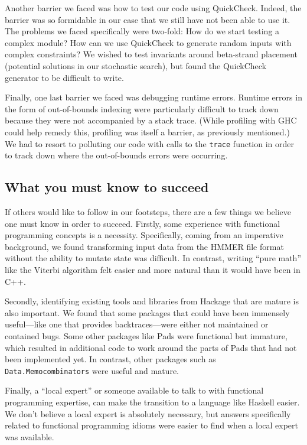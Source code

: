 \documentclass[preprint,nonatbib,blockstyle,nocopyrightspace,times]{sigplanconf}
\begin{document}
Another barrier we faced was how to test our code using QuickCheck.
Indeed, the barrier was so formidable in our case that we still have not been 
able to use it.
The problems we faced specifically were two-fold: How do we start testing
a complex module? How can we use QuickCheck to generate random inputs with 
complex constraints? 
We wished to test invariants around beta-strand placement 
(potential solutions in our stochastic search), but found the QuickCheck generator
to be difficult to write.

Finally, one last barrier we faced was debugging runtime errors.
Runtime errors in the form of out-of-bounds indexing were particularly 
difficult to track down because they were not accompanied by a stack trace.
(While profiling with GHC could help remedy this, profiling was itself a 
barrier, as previously mentioned.)
We had to resort to polluting our code with calls to the \texttt{trace} function 
in order to track down where the out-of-bounds errors were occurring.


\subsection{What you must know to succeed}
If others would like to follow in our footsteps, there are a few
things we believe one must know in order to succeed.
Firstly, some experience with functional programming concepts is a necessity. 
Specifically, coming from an imperative background, we found transforming input data 
from the HMMER file format without the ability to mutate state was difficult.
In contrast, writing ``pure math'' like the Viterbi algorithm felt easier
and more natural than it would have been in C++.

Secondly, identifying existing tools and libraries from Hackage that are mature 
is also important.
We found that some packages that could have been immensely useful---like one 
that provides backtraces---were either not maintained or contained bugs.
Some other packages like Pads were functional but immature, which resulted in 
additional code to work around the parts of Pads that had not been implemented 
yet. 
In contrast, other packages such as \texttt{Data.Memocombinators} were
useful and mature.

Finally, a ``local expert'' or someone available to talk to with functional 
programming expertise, can make the transition to a language like Haskell 
easier.
We don't believe a local expert is absolutely necessary, but answers 
specifically related to functional programming idioms were easier to find when 
a local expert was available.
\end{document}
